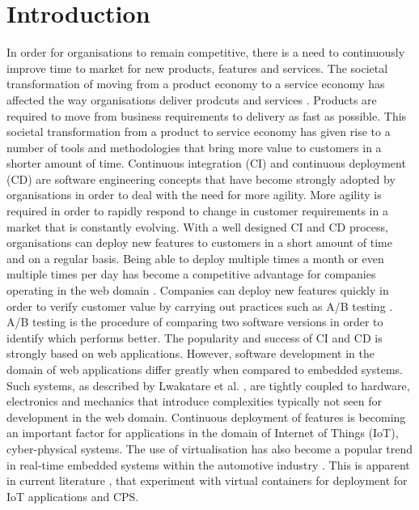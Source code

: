 \iffalse  \fi
%
\chapter{Introduction}
In order for organisations to remain competitive, there is a need to continuously improve time to market for new products, features and services. The societal transformation of moving from a product economy to a service economy has affected the way organisations deliver prodcuts and services \cite{mckinsey}. Products are required to move from business requirements to delivery as fast as possible. This societal transformation from a product to service economy has given rise to a number of tools and methodologies that bring more value to customers in a shorter amount of time. Continuous integration (CI) and continuous deployment (CD) are software engineering concepts that have become strongly adopted by organisations in order to deal with the need for more agility. More agility is required in order to rapidly respond to change in customer requirements in a market that is constantly evolving. With a well designed CI and CD process, organisations can deploy new features to customers in a short amount of time and on a regular basis. Being able to deploy multiple times a month or even multiple times per day has become a competitive advantage for companies operating in the web domain \cite{facebook}. Companies can deploy new features quickly in order to verify customer value by carrying out practices such as A/B testing \cite{abtest}. A/B testing is the procedure of comparing two software versions in order to identify which performs better. The popularity and success of CI and CD is strongly based on web applications. However, software development in the domain of web applications differ greatly when compared to embedded systems. Such systems, as described by Lwakatare et al. \cite{7427859}, are tightly coupled to hardware, electronics and mechanics that introduce complexities typically not seen for development in the web domain. Continuous deployment of features is becoming an important factor for applications in the domain of Internet of Things (IoT), cyber-physical systems. The use of virtualisation has also become a popular trend in real-time embedded systems within the automotive industry \cite{aich}. This is apparent in current literature \cite{gonz,cberger,2iot}, that experiment with virtual containers for deployment for IoT applications and CPS. \\

